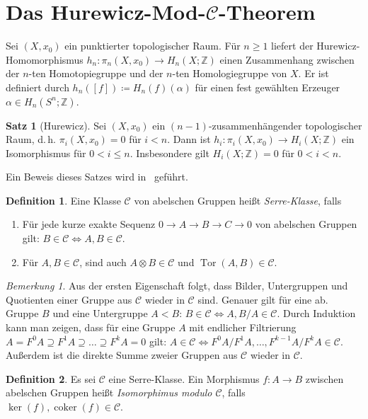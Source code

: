 \documentclass[11pt, a4paper, german]{article}
\theoremstyle{definition}
\newtheorem{satz}{Satz}
\newtheorem{defn}{Definition}
\theoremstyle{remark}
\newtheorem*{bem}{Bemerkung}
\newcommand{\Z}{\mathbb{Z}} %
\DeclareMathOperator{\coker}{coker} %
\DeclareMathOperator{\Tor}{Tor} %
\newcommand{\SC}{\mathcal{C}} %
\renewcommand{\dh}{d.\,h.} %
\begin{document}
\section{Das Hurewicz-Mod-$\SC$-Theorem}

Sei $(X, x_0)$ ein punktierter topologischer Raum.
Für $n \geq 1$ liefert der Hurewicz-Homomorphismus $h_n : \pi_n(X, x_0) \to H_n(X; \Z)$ einen Zusammenhang zwischen der $n$-ten Homotopiegruppe und der $n$-ten Homologiegruppe von $X$.
Er ist definiert durch $h_n([f]) \coloneqq H_n(f)(\alpha)$ für einen fest gewählten Erzeuger $\alpha \in H_n(S^n; \Z)$.

\begin{satz}[Hurewicz]
  Sei $(X, x_0)$ ein $(n{-}1)$-zusammenhängender topologischer Raum, \dh{} $\pi_i(X, x_0) = 0$ für $i < n$.
  Dann ist $h_i : \pi_i(X, x_0) \to H_i(X; \Z)$ ein Isomorphismus für $0 < i \leq n$.
  Insbesondere gilt $H_i(X; \Z) = 0$ für $0 < i < n$.
\end{satz}

Ein Beweis dieses Satzes wird in~\cite[S. 366ff]{hatcher:at} geführt.

\begin{defn}
  Eine Klasse $\SC$ von abelschen Gruppen heißt \emph{Serre-Klasse}, falls
  \begin{enumerate}
    \item Für jede kurze exakte Sequenz $0 \to A \to B \to C \to 0$ von abelschen Gruppen gilt: $B \in \SC \iff A, B \in \SC$.
    \item Für $A, B \in \SC$, sind auch $A \otimes B \in \SC$ und $\Tor(A, B) \in \SC$.
  \end{enumerate}
\end{defn}

\begin{bem}
  Aus der ersten Eigenschaft folgt, dass Bilder, Untergruppen und Quotienten einer Gruppe aus $\SC$ wieder in $\SC$ sind.
  Genauer gilt für eine ab. Gruppe $B$ und eine Untergruppe $A < B$: $B \in \SC \iff A, B/A \in \SC$.
  Durch Induktion kann man zeigen, dass für eine Gruppe $A$ mit endlicher Filtrierung
  $A = F^0 A \supseteq F^1 A \supseteq \ldots \supseteq F^k A = 0$
  gilt: $A \in \SC \iff F^0 A / F^1 A, \ldots, F^{k-1} A / F^k A \in \SC$.
  Außerdem ist die direkte Summe zweier Gruppen aus $\SC$ wieder in $\SC$.
\end{bem}

\begin{defn}
  Es sei $\SC$ eine Serre-Klasse.
  Ein Morphismus $f : A \to B$ zwischen abelschen Gruppen heißt \emph{Isomorphimus modulo $\SC$}, falls $\ker(f), \coker(f) \in \SC$. \\
\end{defn}
\end{document}
